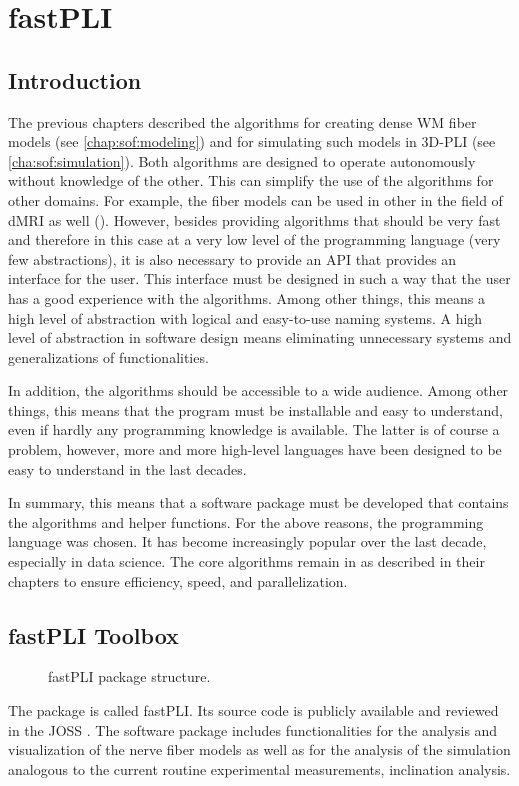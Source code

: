 \cleardoublepage
\setcounter{chapter}{5}
\chapter{\acs{fastPLI}}
\label{chap:Software}
% 
% 
% 
\section{Introduction}\label{sec:fastpliIntro}
%
The previous chapters described the algorithms for creating dense \ac{WM} fiber models (see \cref{chap:sof:modeling}) and for simulating such models in \ac{3D-PLI} (see \cref{cha:sof:simulation}).
Both algorithms are designed to operate autonomously without knowledge of the other.
This can simplify the use of the algorithms for other domains. For example, the fiber models can be used in other in the field of \ac{dMRI} as well (\cite{Ginsburger2019,ginsburgerDis2019}).
However, besides providing algorithms that should be very fast and therefore in this case at a very low level of the programming language (very few abstractions), it is also necessary to provide an API that provides an interface for the user.
This interface must be designed in such a way that the user has a good experience with the algorithms.
Among other things, this means a high level of abstraction with logical and easy-to-use naming systems.
A high level of abstraction in software design means eliminating unnecessary systems and generalizations of functionalities.
\par
%
In addition, the algorithms should be accessible to a wide audience.
Among other things, this means that the program must be installable and easy to understand, even if hardly any programming knowledge is available.
The latter is of course a problem, however, more and more high-level languages have been designed to be easy to understand in the last decades.
\par
%
In summary, this means that a software package must be developed that contains the algorithms and helper functions.
For the above reasons, the \python{} programming language was chosen.
It has become increasingly popular over the last decade, especially in data science.
The core algorithms remain in \cpp{} as described in their chapters to ensure efficiency, speed, and parallelization.
%
\section{fastPLI Toolbox}
%
\begin{figure}[!ht]
\centering
{}
\caption{\acs{fastPLI} package structure.}
\label{fig:fastpli}
\end{figure}
%
The \python{} package is called  \ac{fastPLI}.
Its source code is publicly available and reviewed in the \ac{JOSS} \cite{fastpli,Matuschke2021}.
The software package includes functionalities for the analysis and visualization of the nerve fiber models as well as for the analysis of the simulation analogous to the current routine experimental measurements, \eg{} inclination analysis.
%
%
%
